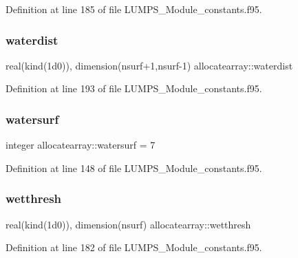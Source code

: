 Definition at line 185 of file L\+U\+M\+P\+S\+\_\+\+Module\+\_\+constants.\+f95.

\mbox{\label{namespaceallocatearray_a7d0c9b91506a6be29f8c45bbb9a0411c}} 
\subsubsection{\texorpdfstring{waterdist}{waterdist}}
{\footnotesize\ttfamily real(kind(1d0)), dimension(nsurf+1,nsurf-\/1) allocatearray\+::waterdist}



Definition at line 193 of file L\+U\+M\+P\+S\+\_\+\+Module\+\_\+constants.\+f95.

\mbox{\label{namespaceallocatearray_ae2de5706788fcce82e02bb4d8f512988}} 
\subsubsection{\texorpdfstring{watersurf}{watersurf}}
{\footnotesize\ttfamily integer allocatearray\+::watersurf = 7}



Definition at line 148 of file L\+U\+M\+P\+S\+\_\+\+Module\+\_\+constants.\+f95.

\mbox{\label{namespaceallocatearray_ade77725040669c18c67ee2a4891b2711}} 
\subsubsection{\texorpdfstring{wetthresh}{wetthresh}}
{\footnotesize\ttfamily real(kind(1d0)), dimension(nsurf) allocatearray\+::wetthresh}



Definition at line 182 of file L\+U\+M\+P\+S\+\_\+\+Module\+\_\+constants.\+f95.

\mbox{\label{namespaceallocatearray_a87e57bcd0e82e8977342bdfd009ffd37}} 
